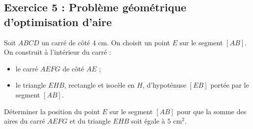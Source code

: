 \documentclass[11pt,a4paper]{article}
\begin{document}
\subsection*{Exercice 5 : Problème géométrique d'optimisation d'aire}
Soit $ABCD$ un carré de côté $4\text{ cm}$. On choisit un point $E$ sur le segment $[AB]$.
On construit à l'intérieur du carré :
\begin{itemize}
    \item le carré $AEFG$ de côté $AE$ ;
    \item le triangle $EHB$, rectangle et isocèle en $H$, d'hypoténuse $[EB]$ portée par le segment $[AB]$.
\end{itemize}
Déterminer la position du point $E$ sur le segment $[AB]$ pour que la somme des aires du carré $AEFG$ et du triangle $EHB$ soit égale à $5\text{ cm}^2$.
\end{document}
